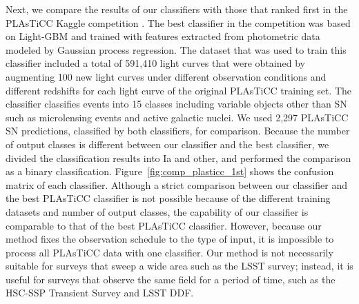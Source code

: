 \documentclass[useamsfonts]{pasj01}
\begin{document}
Next, we compare the results of our classifiers with those that ranked first in the PLAsTiCC Kaggle competition \citep{malz19a}.
The best classifier in the competition \citep{boone19a} was based on Light-GBM and trained with features extracted from photometric data modeled by Gaussian process regression.
The dataset that was used to train this classifier included a total of 591,410 light curves that were obtained by augmenting 100 new light curves under different observation conditions and different redshifts for each light curve of the original PLAsTiCC training set.
The classifier classifies events into 15 classes including variable objects other than SN such as microlensing events and active galactic nuclei.
We used 2,297 PLAsTiCC SN predictions, classified by both classifiers, for comparison.
Because the number of output classes is different between our classifier and the best classifier, we divided the classification results into Ia and other, and performed the comparison as a binary classification.
Figure\ \ref{fig:comp_plasticc_1st} shows the confusion matrix of each classifier.
Although a strict comparison between our classifier and the best PLAsTiCC classifier is not possible because of the different training datasets and number of output classes, the capability of our classifier is comparable to that of the best PLAsTiCC classifier.
However, because our method fixes the observation schedule to the type of input, it is impossible to process all PLAsTiCC data with one classifier.
Our method is not necessarily suitable for surveys that sweep a wide area such as the LSST survey; instead, it is useful for surveys that observe the same field for a period of time, such as the HSC-SSP Transient Survey and LSST DDF.
%
\end{document}
